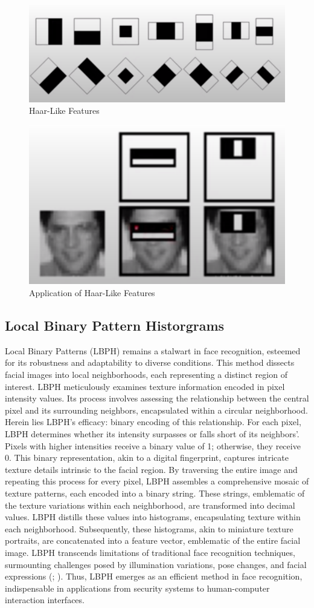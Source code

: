 \documentclass[
]{article}
\begin{document}
\begin{figure}[htbp]
  \centering
  \includegraphics[width=0.4\linewidth]{images/haar_features.png}
  \caption{Haar-Like Features}
\end{figure}

\begin{figure}[htbp]
  \centering
  \includegraphics[width=0.4\linewidth]{images/haar_features_1.png}
  \caption{Application of Haar-Like Features}
\end{figure}

\begin{multicols}{2}

\section{Local Binary Pattern Historgrams}
Local Binary Patterns (LBPH) remains a stalwart in face recognition, esteemed for its robustness and adaptability to diverse conditions. This method dissects facial images into local neighborhoods, each representing a distinct region of interest. LBPH meticulously examines texture information encoded in pixel intensity values. Its process involves assessing the relationship between the central pixel and its surrounding neighbors, encapsulated within a circular neighborhood. Herein lies LBPH's efficacy: binary encoding of this relationship. For each pixel, LBPH determines whether its intensity surpasses or falls short of its neighbors'. Pixels with higher intensities receive a binary value of 1; otherwise, they receive 0. This binary representation, akin to a digital fingerprint, captures intricate texture details intrinsic to the facial region. By traversing the entire image and repeating this process for every pixel, LBPH assembles a comprehensive mosaic of texture patterns, each encoded into a binary string. These strings, emblematic of the texture variations within each neighborhood, are transformed into decimal values. LBPH distills these values into histograms, encapsulating texture within each neighborhood. Subsequently, these histograms, akin to miniature texture portraits, are concatenated into a feature vector, emblematic of the entire facial image. LBPH transcends limitations of traditional face recognition techniques, surmounting challenges posed by illumination variations, pose changes, and facial expressions (\cite{ahonen2004}; \cite{tan2007}). Thus, LBPH emerges as an efficient method in face recognition, indispensable in applications from security systems to human-computer interaction interfaces.

\end{multicols}
\end{document}
